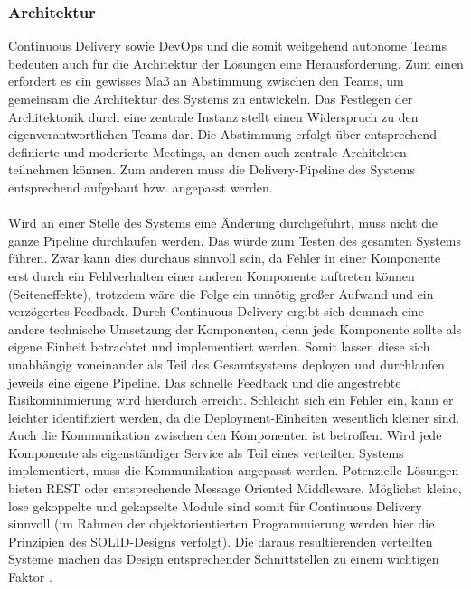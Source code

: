 \subsubsection{Architektur}
Continuous Delivery sowie DevOps und die somit weitgehend autonome Teams bedeuten auch für die Architektur der Lösungen eine Herausforderung. Zum einen erfordert es ein gewisses Maß an Abstimmung zwischen den Teams, um gemeinsam die Architektur des Systems zu entwickeln. Das Festlegen der Architektonik durch eine zentrale Instanz stellt einen Widerspruch zu den eigenverantwortlichen Teams dar. Die Abstimmung erfolgt über entsprechend definierte und moderierte Meetings, an denen auch zentrale Architekten teilnehmen können. Zum anderen muss die Delivery-Pipeline des Systems entsprechend aufgebaut bzw. angepasst werden.\\ \\ Wird an einer Stelle des Systems eine Änderung durchgeführt, muss nicht die ganze Pipeline durchlaufen werden. Das würde zum Testen des gesamten Systems führen. Zwar kann dies durchaus sinnvoll sein, da Fehler in einer Komponente erst durch ein Fehlverhalten einer anderen Komponente auftreten können (Seiteneffekte), trotzdem wäre die Folge ein unnötig großer Aufwand und ein verzögertes Feedback. Durch Continuous Delivery ergibt sich demnach eine andere technische Umsetzung der Komponenten, denn jede Komponente sollte als eigene Einheit betrachtet und implementiert werden. Somit lassen diese sich unabhängig voneinander als Teil des Gesamtsystems deployen und durchlaufen jeweils eine eigene Pipeline. Das schnelle Feedback und die angestrebte Risikominimierung wird hierdurch erreicht. Schleicht sich ein Fehler ein, kann er leichter identifiziert werden, da die Deployment-Einheiten wesentlich kleiner sind. Auch die Kommunikation zwischen den Komponenten ist betroffen. Wird jede Komponente als eigenständiger Service als Teil eines verteilten Systems implementiert, muss die Kommunikation angepasst werden. Potenzielle Lösungen bieten REST oder entsprechende Message Oriented Middleware. Möglichst kleine, lose gekoppelte und gekapselte Module sind somit für Continuous Delivery sinnvoll (im Rahmen der objektorientierten Programmierung werden hier die Prinzipien des SOLID-Designs verfolgt). Die daraus resultierenden verteilten Systeme machen das Design entsprechender Schnittstellen zu einem wichtigen Faktor \cite{Wolff.2016}. \\ \\
